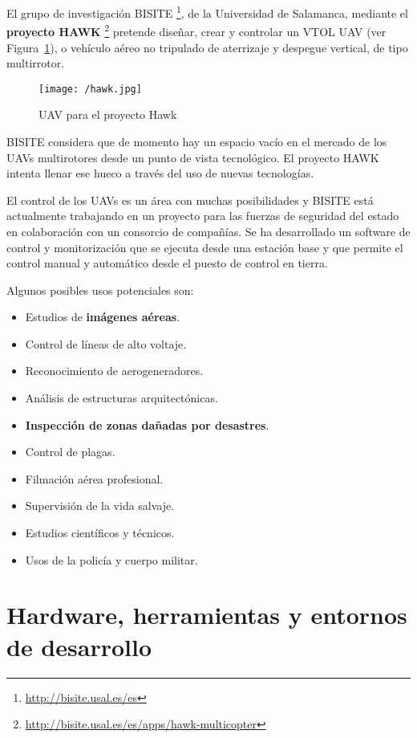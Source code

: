 El grupo de investigación BISITE \footnote{\url{http://bisite.usal.es/es}}, de la Universidad de Salamanca, mediante el \textbf{proyecto HAWK} \footnote{\url{http://bisite.usal.es/es/apps/hawk-multicopter}} pretende diseñar, crear y controlar un \acs{VTOL} \acs{UAV} (ver Figura~\ref{fig:hawk}), o vehículo aéreo no tripulado de aterrizaje y despegue vertical, de tipo multirrotor.

\begin{figure}[!h]
\begin{center}
\texttt{[image: /hawk.jpg]}
\caption[\acs{UAV} para el proyecto Hawk]{\acs{UAV} para el proyecto Hawk}
\label{fig:hawk}
\end{center}
\end{figure}

BISITE considera que de momento hay un espacio vacío en el mercado de los \acs{UAV}s multirotores desde un punto de vista tecnológico. El proyecto HAWK intenta llenar ese hueco a través del uso de nuevas tecnologías. 

El control de los \acs{UAV}s es un área con muchas posibilidades y BISITE está actualmente trabajando en un proyecto para las fuerzas de seguridad del estado en colaboración con un consorcio de compañías. Se ha desarrollado un software de control y monitorización que se ejecuta desde una estación base y que permite el control manual y automático desde el puesto de control en tierra.

Algunos posibles usos potenciales son:
\begin{itemize}
\item Estudios de \textbf{imágenes aéreas}.
\item Control de líneas de alto voltaje.
\item Reconocimiento de aerogeneradores.
\item Análisis de estructuras arquitectónicas.
\item \textbf{Inspección de zonas dañadas por desastres}.
\item Control de plagas.
\item Filmación aérea profesional.
\item Supervisión de la vida salvaje.
\item Estudios científicos y técnicos.
\item Usos de la policía y cuerpo militar.
\end{itemize}

\section{Hardware, herramientas y entornos de desarrollo}
\label{sec:herrmientas}

